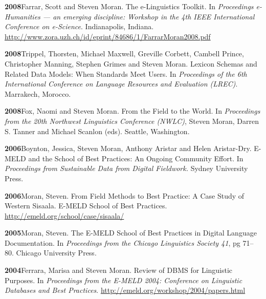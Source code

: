 \documentclass[11pt]{article}
\newcommand{\hangpara}{
 \setlength{\parindent}{0in} %
 \hangindent=0.42in %
}
\begin{document}
\vskip 6pt
\hangpara
{\bf 2008}\hspace{1ex}Farrar, Scott and Steven Moran. The e-Linguistics Toolkit. In {\it Proceedings e-Humanities --- an emerging discipline: Workshop in the 4th IEEE International Conference on e-Science}. Indianapolis, Indiana. \url{http://www.zora.uzh.ch/id/eprint/84686/1/FarrarMoran2008.pdf}

\vskip 6pt
\hangpara
{\bf 2008}\hspace{1ex}Trippel, Thorsten, Michael Maxwell, Greville Corbett, Cambell Prince, Christopher Manning, Stephen Grimes and Steven Moran. Lexicon Schemas and Related Data Models: When Standards Meet Users. In {\it Proceedings of the 6th International Conference on Language Resources and Evaluation (LREC)}. Marrakech, Morocco.

\vskip 6pt
\hangpara
{\bf 2008}\hspace{1ex}Fox, Naomi and Steven Moran. From the Field to the World. In {\it Proceedings from the 20th Northwest Linguistics Conference (NWLC)}, Steven Moran, Darren S. Tanner and Michael Scanlon (eds). Seattle, Washington. %

\vskip 6pt
\hangpara
{\bf 2006}\hspace{1ex}Boynton, Jessica, Steven Moran, Anthony Aristar and Helen Aristar-Dry. E-MELD and the School of Best Practices: An Ongoing Community Effort. In {\it Proceedings from Sustainable Data from Digital Fieldwork.} Sydney University Press. %

\vskip 6pt
\hangpara
{\bf 2006}\hspace{1ex}Moran, Steven. From Field Methods to Best Practice: A Case Study of Western Sisaala. E-MELD School of Best Practices. \url{http://emeld.org/school/case/sisaala/}

\vskip 6pt
\hangpara
{\bf 2005}\hspace{1ex}Moran, Steven. The E-MELD School of Best Practices in Digital Language Documentation. In {\it Proceedings from the Chicago Linguistics Society 41}, pg 71--80. Chicago University Press. 


\vskip 6pt
\hangpara
{\bf 2004}\hspace{1ex}Ferrara, Marisa and Steven Moran. Review of DBMS for Linguistic Purposes. In {\it Proceedings from the E-MELD 2004: Conference on Linguistic Databases and Best Practices}. \url{http://emeld.org/workshop/2004/papers.html}
\end{document}
